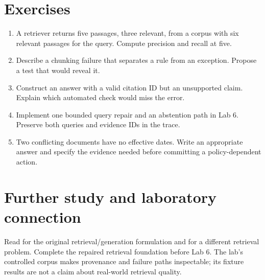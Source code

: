 \section{Exercises}
\begin{enumerate}
\item A retriever returns five passages, three relevant, from a corpus with six relevant passages for the query. Compute precision and recall at five.
\item Describe a chunking failure that separates a rule from an exception. Propose a test that would reveal it.
\item Construct an answer with a valid citation ID but an unsupported claim. Explain which automated check would miss the error.
\item Implement one bounded query repair and an abstention path in Lab 6. Preserve both queries and evidence IDs in the trace.
\item Two conflicting documents have no effective dates. Write an appropriate answer and specify the evidence needed before committing a policy-dependent action.
\end{enumerate}

\section{Further study and laboratory connection}
Read \cite{rag} for the original retrieval/generation formulation and \cite{graphrag} for a different retrieval problem. Complete the repaired retrieval foundation before Lab 6. The lab's controlled corpus makes provenance and failure paths inspectable; its fixture results are not a claim about real-world retrieval quality.

